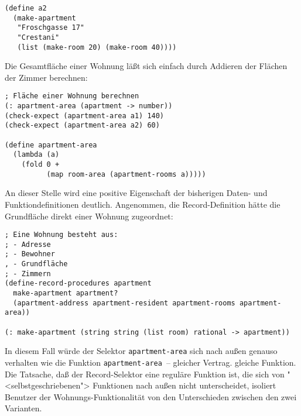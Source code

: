 %
%
\begin{verbatim}
(define a2
  (make-apartment
   "Froschgasse 17"
   "Crestani"
   (list (make-room 20) (make-room 40))))
\end{verbatim}
%
Die Gesamtfläche einer Wohnung läßt sich einfach durch Addieren der
Flächen der Zimmer berechnen:
%
\begin{verbatim}
; Fläche einer Wohnung berechnen
(: apartment-area (apartment -> number))            
(check-expect (apartment-area a1) 140)
(check-expect (apartment-area a2) 60)

(define apartment-area
  (lambda (a)
    (fold 0 +
          (map room-area (apartment-rooms a)))))
\end{verbatim}
%
An dieser Stelle wird eine positive Eigenschaft der bisherigen Daten-
und Funktiondefinitionen deutlich.  Angenommen, die Record-Definition
hätte die Grundfläche direkt einer Wohnung zugeordnet:
%
\begin{verbatim}
; Eine Wohnung besteht aus:
; - Adresse
; - Bewohner
, - Grundfläche
; - Zimmern
(define-record-procedures apartment
  make-apartment apartment?
  (apartment-address apartment-resident apartment-rooms apartment-area))

(: make-apartment (string string (list room) rational -> apartment))
\end{verbatim}
%
In diesem Fall würde der Selektor \texttt{apartment-area} sich nach
außen genauso verhalten wie die Funktion \texttt{apartment-area}~--
gleicher Vertrag. gleiche Funktion.  Die Tatsache, daß der
Record-Selektor eine reguläre Funktion ist, die sich von
"<selbstgeschriebenen"> Funktionen nach außen nicht unterscheidet,
isoliert Benutzer der Wohnungs-Funktionalität von den Unterschieden
zwischen den zwei Varianten.

